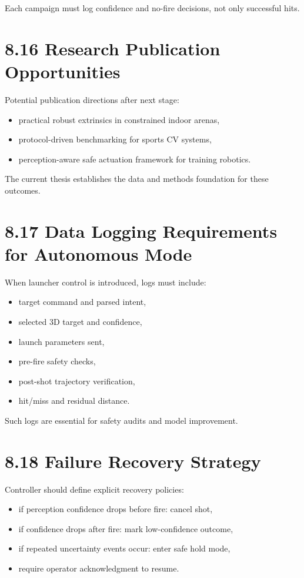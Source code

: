 Each campaign must log confidence and no-fire decisions, not only successful hits.

\section{8.16 Research Publication Opportunities}
Potential publication directions after next stage:
\begin{itemize}
  \item practical robust extrinsics in constrained indoor arenas,
  \item protocol-driven benchmarking for sports CV systems,
  \item perception-aware safe actuation framework for training robotics.
\end{itemize}

The current thesis establishes the data and methods foundation for these outcomes.



\section{8.17 Data Logging Requirements for Autonomous Mode}
When launcher control is introduced, logs must include:
\begin{itemize}
  \item target command and parsed intent,
  \item selected 3D target and confidence,
  \item launch parameters sent,
  \item pre-fire safety checks,
  \item post-shot trajectory verification,
  \item hit/miss and residual distance.
\end{itemize}

Such logs are essential for safety audits and model improvement.

\section{8.18 Failure Recovery Strategy}
Controller should define explicit recovery policies:
\begin{itemize}
  \item if perception confidence drops before fire: cancel shot,
  \item if confidence drops after fire: mark low-confidence outcome,
  \item if repeated uncertainty events occur: enter safe hold mode,
  \item require operator acknowledgment to resume.
\end{itemize}

